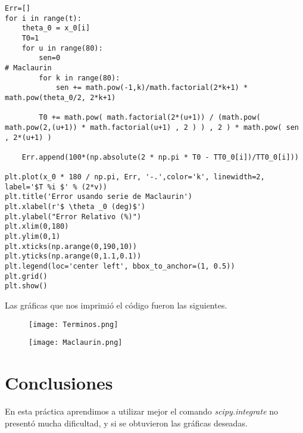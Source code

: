 \documentclass[a4 paper]{article}
\numberwithin{equation}{section}
\newcommand{\0}{\mathbf{0}}
\begin{document}
\begin{verbatim}
Err=[]
for i in range(t):
    theta_0 = x_0[i]
    T0=1
    for u in range(80):
        sen=0
# Maclaurin
        for k in range(80):
            sen += math.pow(-1,k)/math.factorial(2*k+1) * math.pow(theta_0/2, 2*k+1)
            
        T0 += math.pow( math.factorial(2*(u+1)) / (math.pow( math.pow(2,(u+1)) * math.factorial(u+1) , 2 ) ) , 2 ) * math.pow( sen , 2*(u+1) )   
    
    Err.append(100*(np.absolute(2 * np.pi * T0 - TT0_0[i])/TT0_0[i]))

plt.plot(x_0 * 180 / np.pi, Err, '-.',color='k', linewidth=2, label='$T %i $' % (2*v))
plt.title('Error usando serie de Maclaurin')
plt.xlabel(r'$ \theta _0 (deg)$')
plt.ylabel("Error Relativo (%)")
plt.xlim(0,180)
plt.ylim(0,1)
plt.xticks(np.arange(0,190,10))
plt.yticks(np.arange(0,1.1,0.1))
plt.legend(loc='center left', bbox_to_anchor=(1, 0.5))
plt.grid()
plt.show()

\end{verbatim}

Las gr\'aficas que nos imprimi\'o el c\'odigo fueron las siguientes.

\begin{figure}[!ht]
  \centering
      \texttt{[image: Terminos.png]}
  \caption{}
\end{figure}
\newpage
\begin{figure}[!ht]
  \centering
      \texttt{[image: Maclaurin.png]}
  \caption{}
\end{figure}

\section*{Conclusiones}

En esta pr\'actica aprendimos a utilizar mejor el comando {\it scipy.integrate} no present\'o mucha dificultad, y si se obtuvieron las gr\'aficas deseadas.
\end{document}
